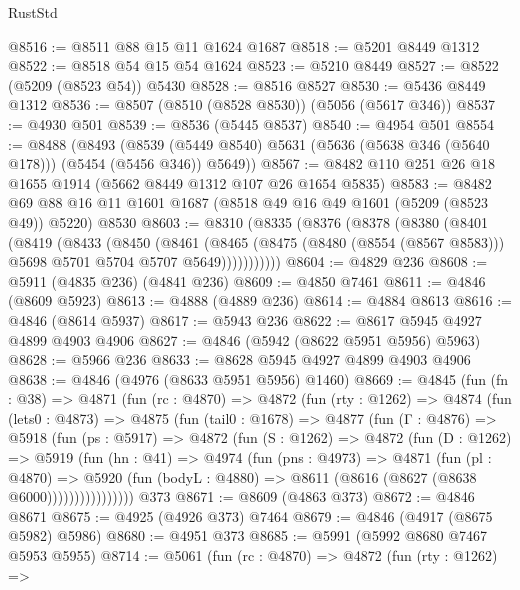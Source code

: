 \begin{lexlean}{RustStd}
\begin{coremodule}
@8516 := @8511 @88 @15 @11 @1624 @1687
@8518 := @5201 @8449 @1312
@8522 := @8518 @54 @15 @54 @1624
@8523 := @5210 @8449
@8527 := @8522 (@5209 (@8523 @54)) @5430
@8528 := @8516 @8527
@8530 := @5436 @8449 @1312
@8536 := @8507 (@8510 (@8528 @8530)) (@5056 (@5617 @346))
@8537 := @4930 @501
@8539 := @8536 (@5445 @8537)
@8540 := @4954 @501
@8554 := @8488
    (@8493 (@8539 (@5449 @8540) @5631 (@5636 (@5638 @346 (@5640 @178))) (@5454 (@5456 @346)) @5649))
@8567 := @8482 @110 @251 @26 @18 @1655 @1914 (@5662 @8449 @1312 @107 @26 @1654 @5835)
@8583 := @8482 @69 @88 @16 @11 @1601 @1687 (@8518 @49 @16 @49 @1601 (@5209 (@8523 @49)) @5220) @8530
@8603 := @8310
    (@8335
      (@8376
        (@8378
          (@8380
            (@8401
              (@8419
                (@8433
                  (@8450
                    (@8461
                      (@8465
                        (@8475
                          (@8480 (@8554 (@8567 @8583)))
                          @5698
                          @5701
                          @5704
                          @5707
                          @5649)))))))))))
@8604 := @4829 @236
@8608 := @5911 (@4835 @236) (@4841 @236)
@8609 := @4850 @7461
@8611 := @4846 (@8609 @5923)
@8613 := @4888 (@4889 @236)
@8614 := @4884 @8613
@8616 := @4846 (@8614 @5937)
@8617 := @5943 @236
@8622 := @8617 @5945 @4927 @4899 @4903 @4906
@8627 := @4846 (@5942 (@8622 @5951 @5956) @5963)
@8628 := @5966 @236
@8633 := @8628 @5945 @4927 @4899 @4903 @4906
@8638 := @4846 (@4976 (@8633 @5951 @5956) @1460)
@8669 := @4845
    (fun (fn : @38) =>
    @4871
      (fun (rc : @4870) =>
      @4872
        (fun (rty : @1262) =>
        @4874
          (fun (lets0 : @4873) =>
          @4875
            (fun (tail0 : @1678) =>
            @4877
              (fun (Γ : @4876) =>
              @5918
                (fun (ps : @5917) =>
                @4872
                  (fun (S : @1262) =>
                  @4872
                    (fun (D : @1262) =>
                    @5919
                      (fun (hn : @41) =>
                      @4974
                        (fun (pns : @4973) =>
                        @4871
                          (fun (pl : @4870) =>
                          @5920
                            (fun (bodyL : @4880) => @8611 (@8616 (@8627 (@8638 @6000))))))))))))))))
    @373
@8671 := @8609 (@4863 @373)
@8672 := @4846 @8671
@8675 := @4925 (@4926 @373) @7464
@8679 := @4846 (@4917 (@8675 @5982) @5986)
@8680 := @4951 @373
@8685 := @5991 (@5992 @8680 @7467 @5953 @5955)
@8714 := @5061
    (fun (rc : @4870) =>
    @4872
      (fun (rty : @1262) =>

\end{coremodule}
\end{lexlean}
